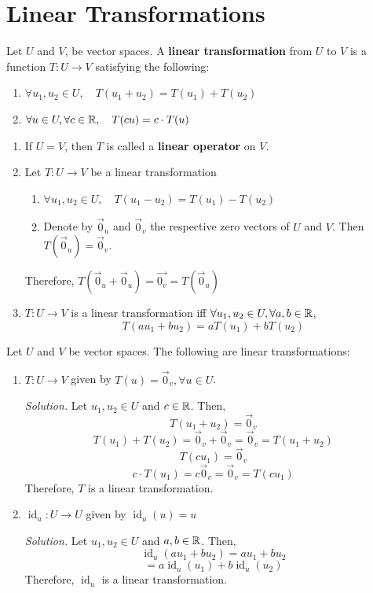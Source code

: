 \newpage
\section{Linear Transformations}
\begin{definition}
Let $U$ and $V$, be vector spaces. A \textbf{linear transformation} from $U$ to $V$ is a function $T: U \to V$ satisfying the following:
\begin{enumerate}
    \item $\forall u_1, u_2 \in U, \quad T(u_1 + u_2) = T(u_1) + T(u_2)$ 
    \item $\forall u \in U, \forall c \in \mathbb{R}, \quad T(cu) = c \cdot T(u)$
\end{enumerate}
\end{definition}

\begin{remark}
\leavevmode
\begin{enumerate}
    \item If $U = V$, then $T$ is called a \textbf{linear operator} on $V$.
    \item Let $T : U \to V$ be a linear transformation
    \begin{enumerate}
        \item $\forall u_1, u_2 \in U, \quad T(u_1 - u_2) = T(u_1) - T(u_2)$
        \item Denote by $\vec{0}_u$ and $\vec{0}_v$ the respective zero vectors of $U$ and $V$. Then $T(\vec{0}_u) = \vec{0}_v$.
    \end{enumerate}
    Therefore, $T(\vec{0}_u + \vec{0}_u) = \vec{0_v} = T(\vec{0}_u)$
    \item $T: U \to V$ is a linear transformation iff $\forall u_1, u_2 \in U, \forall a, b \in \mathbb{R}$,
    $$T(au_1 + bu_2) = aT(u_1) + bT(u_2)$$
\end{enumerate}
\end{remark}

\begin{example}
Let $U$ and $V$ be vector spaces. The following are linear transformations:
\begin{enumerate}
    \item $T: U \to V$ given by $T(u) = \vec{0}_v, \forall u \in U$.
    \leavevmode
    
    \textit{Solution.} Let $u_1, u_2 \in U$ and $c \in \mathbb{R}$. Then,
    $$T(u_1 + u_2) = \vec{0}_v$$
    $$T(u_1) + T(u_2) = \vec{0}_v + \vec{0}_v = \vec{0}_v = T(u_1 + u_2)$$
    $$T(cu_1) = \vec{0}_v$$
    $$c \cdot T(u_1) = c\vec{0}_v = \vec{0}_v = T(cu_1)$$
    Therefore, $T$ is a linear transformation.
    \item $\operatorname{id}_u: U \to U$ given by $\operatorname{id}_u(u) = u$
    \leavevmode

    \textit{Solution.} Let $u_1, u_2 \in U$ and $a, b \in \mathbb{R}$. Then,
    $$\operatorname{id}_u(au_1 + bu_2) = au_1 + bu_2$$
    $$=a\operatorname{id}_u(u_1) + b\operatorname{id}_u(u_2) $$
    Therefore, $\operatorname{id}_u$ is a linear transformation.
\end{enumerate}
\end{example}

